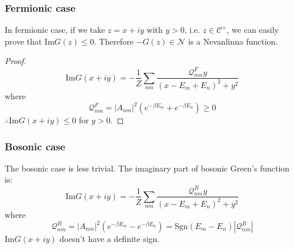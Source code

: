 \documentclass[
	preprint,%
	aps,
	prb,
	showpacs,	
	amsmath, amssymb]{revtex4-2}
\newcommand{\im}{ {\mathrm{Im}} }
\newcommand{\sgn}{ {\mathrm{Sgn}} }
\newcommand{\C}{ {\mathcal{C}} }
\newcommand{\N}{ {\mathcal{N}} }
\begin{document}
\subsubsection{Fermionic case}
\label{eq:fermionic-case}
In fermionic case, if we take $z = x + iy$ with $y>0$, 
i.e. $z\in \C^+$, we can easily prove that $\im G(z) \leq 0$.
Therefore $-G(z) \in \N$ is a Nevanlinna function.
\begin{proof}
	\begin{equation}
	\im G(x+iy) = - \frac{1}{Z} \sum_{nm}
	\frac{\mathcal{Q}^F_{nm} y}{(x - E_m + E_n)^2 + y^2}
	\end{equation}
where
\begin{equation}
	\mathcal{Q}^F_{nm} = |A_{nm}|^2 (e^{-\beta E_m} + e^{-\beta E_n}) \geq 0
\end{equation}
$\therefore \im G(x+iy) \leq 0$ for $y > 0$.
\end{proof}


\subsubsection{Bosonic case}
\label{eq:bosonic-case}
The bosonic case is less trivial. 
The imaginary part of bosonic Green's function is:
\begin{equation}
	\im G(x+iy) = - \frac{1}{Z} \sum_{nm}
	\frac{\mathcal{Q}^B_{nm} y}{(x - E_m + E_n)^2 + y^2}
	\end{equation}
where
\begin{equation}
	\mathcal{Q}^B_{nm} = |A_{nm}|^2 (e^{-\beta E_m} - e^{-\beta E_n})
	=\sgn(E_m-E_n) |\mathcal{Q}^B_{nm}|
\end{equation}
$\im G(x+iy)$ doesn't have a definite sign.
\end{document}
